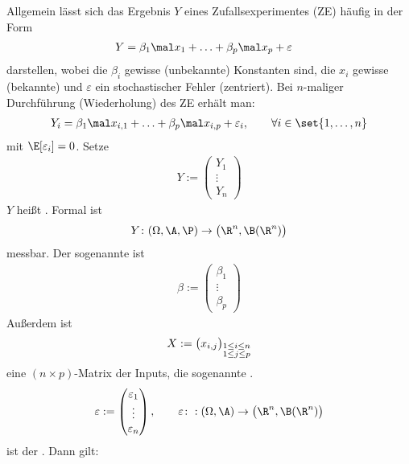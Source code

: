 Allgemein lässt sich das Ergebnis $Y$ eines Zufallsexperimentes (ZE) häufig in der Form
\begin{align*}
	Y&=\beta_1\mal x_1+\ldots+\beta_p\mal x_p+\varepsilon
\end{align*}
darstellen, wobei die $\beta_i$ gewisse (unbekannte) Konstanten sind, die $x_i$ gewisse (bekannte)  und $\varepsilon$ ein stochastischer Fehler (zentriert).
Bei $n$-maliger Durchführung (Wiederholung) des ZE erhält man:
\begin{align}\label{eq:1.1}
	Y_i=\beta_1\mal x_{i,1}+\ldots+\beta_p\mal x_{i,p}+\varepsilon_i,\qquad\forall i\in\set{1,\ldots,n}
\end{align}
mit $\E[\varepsilon_i]=0$.
Setze
\begin{align*}
	Y:=
	\begin{pmatrix}
		Y_1\\
		\vdots\\
		Y_n
	\end{pmatrix}
\end{align*}
$Y$ heißt .
Formal ist
\begin{align*}
	Y\colon(\Omega,\A,\P)\to\big(\R^n,\B(\R^n)\big)
\end{align*}
messbar.
Der sogenannte  ist
\begin{align*}
	\beta:=\begin{pmatrix}
		\beta_1\\
		\vdots\\
		\beta_p
	\end{pmatrix}
\end{align*}
Außerdem ist
\begin{align*}
	X:=\big(x_{i,j}\big)_{\begin{subarray}{c}
		1\leq i\leq n\\
		1\leq j\leq p
	\end{subarray}}
\end{align*}
eine $(n\times p)$-Matrix der Inputs, die sogenannte .
\begin{align*}
	\varepsilon:=\begin{pmatrix}
		\varepsilon_1\\
		\vdots\\
		\varepsilon_n
	\end{pmatrix},\qquad
	\varepsilon\colon:(\Omega,\A)\to\big(\R^n,\B(\R^n)\big)
\end{align*}
ist der .
Dann gilt:
